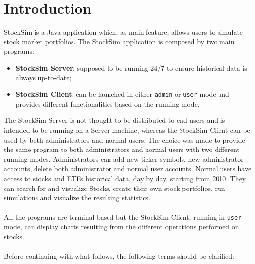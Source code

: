 \chapter{Introduction}
StockSim is a Java application which, as main feature, allows users to simulate 
stock market portfolios. The StockSim application is composed by two main 
programs:
\begin{itemize}
    \item \textbf{StockSim Server}: supposed to be running 24/7 to ensure 
            historical data is always up-to-date;
    \item \textbf{StockSim Client}: can be launched in either \texttt{admin} or 
            \texttt{user} mode and provides different functionalities based on
            the running mode.
\end{itemize}
The StockSim Server is not thought to be distributed to end users and is
intended to be running on a Server machine, whereas the StockSim Client can be
used by both administrators and normal users. The choice was made to provide the
same program to both administrators and normal users with two different running
modes. Administrators can add new ticker symbols, new administrator accounts,
delete both administrator and normal user accounts. Normal users have access to
stocks and ETFs historical data, day by day, starting from 2010. They can search
for and visualize Stocks, create their own stock portfolios, run simulations and
visualize the resulting statistics.\\
\\
All the programs are terminal based but the StockSim Client, running in
\texttt{user} mode, can display charts resulting from the different operations
performed on stocks.\\
\\
Before continuing with what follows, the following terms should be clarified:
